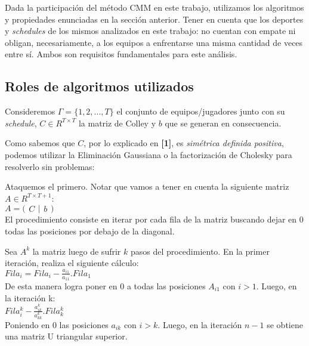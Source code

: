 Dada la participaci\'on del m\'etodo CMM en este trabajo, utilizamos los algoritmos y propiedades enunciadas en la secci\'on anterior. Tener en cuenta que los deportes y \textit{schedules} de los mismos analizados en este trabajo: no cuentan con empate ni obligan, necesariamente, a los equipos a enfrentarse una misma cantidad de veces entre s\'i. Ambos son requisitos fundamentales para este an\'alisis.

\subsection{Roles de algoritmos utilizados}

Consideremos $\Gamma = \{1,2,...,T\}$ el conjunto de equipos/jugadores junto con su \textit{schedule}, $C \in R^{T \times T}$ la matriz de Colley y $b$ que se generan en consecuencia.

Como sabemos que $C$, por lo explicado en \textbf{[1]}, es \textit{sim\'etrica definida positiva}, podemos utilizar la Eliminaci\'on Gaussiana o la factorizaci\'on de Cholesky para resolverlo sin problemas:

Ataquemos el primero. Notar que vamos a tener en cuenta la siguiente matriz $A \in R^{T \times T+1}$: \\

$A = \Big(
\begin{matrix}
C
\end{matrix}
\vert
\begin{matrix}
b
\end{matrix}
\Big)$ \\

El procedimiento consiste en iterar por cada fila de la matriz buscando dejar en 0 todas las posiciones por debajo de la diagonal.

Sea $A^{k}$ la matriz luego de sufrir $k$ pasos del procedimiento. En la primer iteraci\'on, realiza el siguiente c\'alculo: \\

$Fila_{i} = Fila_{i} - \frac{a_{i1}}{a_{11}} . Fila_{1}$ \\

De esta manera logra poner en $0$ a todas las posiciones $A_{i1}$ con $i > 1$. Luego, en la iteraci\'on k: \\

$Fila_{i}^{k} - \frac{a_{ik}^{k}}{a_{kk}^{k}} . Fila_{k}^{k}$ \\

Poniendo en $0$ las posiciones $a_{ik}$ con $i > k$. Luego, en la iteraci\'on $n-1$ se obtiene una matriz U triangular superior.

